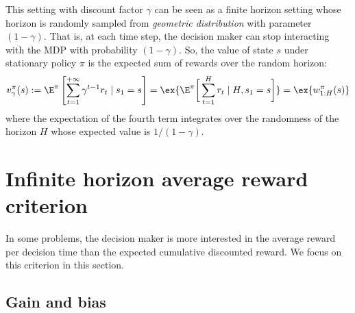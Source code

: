 This setting with discount factor $\gamma$ can be seen as a finite horizon setting whose horizon is randomly sampled from \emph{geometric distribution} with parameter $(1-\gamma)$.
That is, at each time step, the decision maker can stop interacting with the MDP with probability $(1-\gamma)$.
So, the value of state $s$ under stationary policy $\pi$ is the expected sum of rewards over the random horizon:
\begin{equation}
    \label{eq:discount_finite}
    v^\pi_\gamma(s) :=\E^\pi\left[\sum_{t=1}^{+\infty} \gamma^{t-1}r_t \mid s_1=s\right] =\ex{\E^\pi\bigg[\sum_{t=1}^H r_t\mid H, s_1=s\bigg]} =\ex{w^\pi_{1:H}(s)}
\end{equation}
where the expectation of the fourth term integrates over the randomness of the horizon $H$ whose expected value is $1/(1-\gamma)$.

\section{Infinite horizon average reward criterion}
\label{ch:mdp:sec:gain}

In some problems, the decision maker is more interested in the average reward per decision time than the expected cumulative discounted reward.
We focus on this criterion in this section.

\subsection{Gain and bias}

